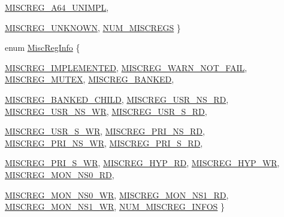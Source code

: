 \begin{DoxyCompactItemize}
\hyperlink{namespaceArmISA_a1e522017e015d4c7efd6b2360143aa67a007e262da6d911cd4d2cc76fcc403519}{MISCREG\_\-A64\_\-UNIMPL}, 
\par
\hyperlink{namespaceArmISA_a1e522017e015d4c7efd6b2360143aa67a2faf6cc15e539d68d494f19a143db688}{MISCREG\_\-UNKNOWN}, 
\hyperlink{namespaceArmISA_a1e522017e015d4c7efd6b2360143aa67a7d1d86545746c83e719e24556985648a}{NUM\_\-MISCREGS}
 \}
\item 
enum \hyperlink{namespaceArmISA_a15dbfdc3ddd278a2d74f8126095c4a29}{MiscRegInfo} \{ \par
\hyperlink{namespaceArmISA_a15dbfdc3ddd278a2d74f8126095c4a29a1fa06bcdce705fdafb3a7cd4c0366147}{MISCREG\_\-IMPLEMENTED}, 
\hyperlink{namespaceArmISA_a15dbfdc3ddd278a2d74f8126095c4a29a9e8a51c2993243cabfd91b041affffa0}{MISCREG\_\-WARN\_\-NOT\_\-FAIL}, 
\hyperlink{namespaceArmISA_a15dbfdc3ddd278a2d74f8126095c4a29acb90eb1feaec74a0e165da3b6fcbf37b}{MISCREG\_\-MUTEX}, 
\hyperlink{namespaceArmISA_a15dbfdc3ddd278a2d74f8126095c4a29a716dd63e30e164b81b00168c5f5d00b6}{MISCREG\_\-BANKED}, 
\par
\hyperlink{namespaceArmISA_a15dbfdc3ddd278a2d74f8126095c4a29ab30ce0348ff320b71d46100b4fb552ca}{MISCREG\_\-BANKED\_\-CHILD}, 
\hyperlink{namespaceArmISA_a15dbfdc3ddd278a2d74f8126095c4a29a476c09c054178b01929e9ae5adb50b03}{MISCREG\_\-USR\_\-NS\_\-RD}, 
\hyperlink{namespaceArmISA_a15dbfdc3ddd278a2d74f8126095c4a29a3fcfd2e8d56ffa62726eac8f732f9a72}{MISCREG\_\-USR\_\-NS\_\-WR}, 
\hyperlink{namespaceArmISA_a15dbfdc3ddd278a2d74f8126095c4a29acbc5eaa54f35c6cee3fb72b2ae119b39}{MISCREG\_\-USR\_\-S\_\-RD}, 
\par
\hyperlink{namespaceArmISA_a15dbfdc3ddd278a2d74f8126095c4a29a01bfdab47d53440f603a7ab6e5af1a12}{MISCREG\_\-USR\_\-S\_\-WR}, 
\hyperlink{namespaceArmISA_a15dbfdc3ddd278a2d74f8126095c4a29a670c59335531e0aecc67888b9528c695}{MISCREG\_\-PRI\_\-NS\_\-RD}, 
\hyperlink{namespaceArmISA_a15dbfdc3ddd278a2d74f8126095c4a29a0e478ec0aeb4663ea6838297355e0276}{MISCREG\_\-PRI\_\-NS\_\-WR}, 
\hyperlink{namespaceArmISA_a15dbfdc3ddd278a2d74f8126095c4a29a1d4dc998b0c15d4ca900f14688b6e17d}{MISCREG\_\-PRI\_\-S\_\-RD}, 
\par
\hyperlink{namespaceArmISA_a15dbfdc3ddd278a2d74f8126095c4a29a243aac87eece3fe08b68ef0cf0ca080f}{MISCREG\_\-PRI\_\-S\_\-WR}, 
\hyperlink{namespaceArmISA_a15dbfdc3ddd278a2d74f8126095c4a29a4d35a889911aec24202076f375b61ab7}{MISCREG\_\-HYP\_\-RD}, 
\hyperlink{namespaceArmISA_a15dbfdc3ddd278a2d74f8126095c4a29a2a78197e4c2c5bce96abbd8b21ff88df}{MISCREG\_\-HYP\_\-WR}, 
\hyperlink{namespaceArmISA_a15dbfdc3ddd278a2d74f8126095c4a29a2e12f00ed6cf18b63500b4d149104b8f}{MISCREG\_\-MON\_\-NS0\_\-RD}, 
\par
\hyperlink{namespaceArmISA_a15dbfdc3ddd278a2d74f8126095c4a29adba81ab58fb8c12ec06596080431f924}{MISCREG\_\-MON\_\-NS0\_\-WR}, 
\hyperlink{namespaceArmISA_a15dbfdc3ddd278a2d74f8126095c4a29a11f58c23f43ea108b44ee1ab6d1a6dc9}{MISCREG\_\-MON\_\-NS1\_\-RD}, 
\hyperlink{namespaceArmISA_a15dbfdc3ddd278a2d74f8126095c4a29ae9f904c7ed8e1e89f70f1e07248e3eb8}{MISCREG\_\-MON\_\-NS1\_\-WR}, 
\hyperlink{namespaceArmISA_a15dbfdc3ddd278a2d74f8126095c4a29a6b07f9631c5ed8e128b42c67c045101b}{NUM\_\-MISCREG\_\-INFOS}
 \}
\end{DoxyCompactItemize}
